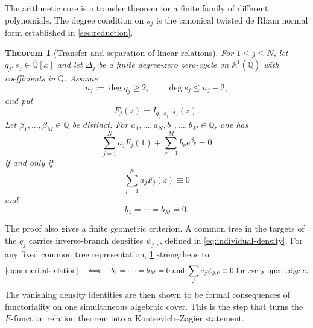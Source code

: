 \documentclass[11pt]{article}
\numberwithin{equation}{section}
\newtheorem{theorem}{Theorem}[section]
\theoremstyle{definition}
\theoremstyle{remark}
\newcommand{\Qbar}{\overline{\mathbb Q}}
\newcommand{\Aone}{\mathbb A^1}
\begin{document}
The arithmetic core is a transfer theorem for a finite family of different
polynomials.  The degree condition on $s_j$ is the canonical twisted de
Rham normal form established in \cref{sec:reduction}.

\begin{theorem}[Transfer and separation of linear relations]
\label{thm:transfer}
For $1\le j\le N$, let $q_j,s_j\in\Qbar[x]$ and let $\Delta_j$ be a finite
degree-zero zero-cycle on $\Aone(\Qbar)$ with coefficients in $\Qbar$.
Assume
\[
  n_j:=\deg q_j\ge2,
  \qquad \deg s_j\le n_j-2,
\]
and put
\[
  F_j(z)=I_{q_j,s_j,\Delta_j}(z).
\]
Let $\beta_1,\ldots,\beta_M\in\Qbar$ be distinct.  For
$a_1,\ldots,a_N,b_1,\ldots,b_M\in\Qbar$, one has
\begin{equation}\label{eq:numerical-relation}
  \sum_{j=1}^{N}a_jF_j(1)
  +\sum_{\nu=1}^{M}b_\nu e^{\beta_\nu}=0
\end{equation}
if and only if
\begin{equation}\label{eq:functional-relation}
  \sum_{j=1}^{N}a_jF_j(z)\equiv0
\end{equation}
and
\[
  b_1=\cdots=b_M=0.
\]
\end{theorem}

The proof also gives a finite geometric criterion.  A common tree in the
targets of the $q_j$ carries inverse-branch densities $\psi_{j,e}$, defined
in \eqref{eq:individual-density}.  For any fixed common tree representation,
\cref{thm:transfer} strengthens to
\begin{equation}\label{eq:geometric-summary}
  \eqref{eq:numerical-relation}
  \quad\Longleftrightarrow\quad
  b_1=\cdots=b_M=0
  \ \text{and}\ 
  \sum_j a_j\psi_{j,e}\equiv0
  \text{ for every open edge }e.
\end{equation}
The vanishing density identities are then shown to be formal consequences
of functoriality on one simultaneous algebraic cover.  This is the step that
turns the $E$-function relation theorem into a Kontsevich--Zagier statement.
\end{document}
